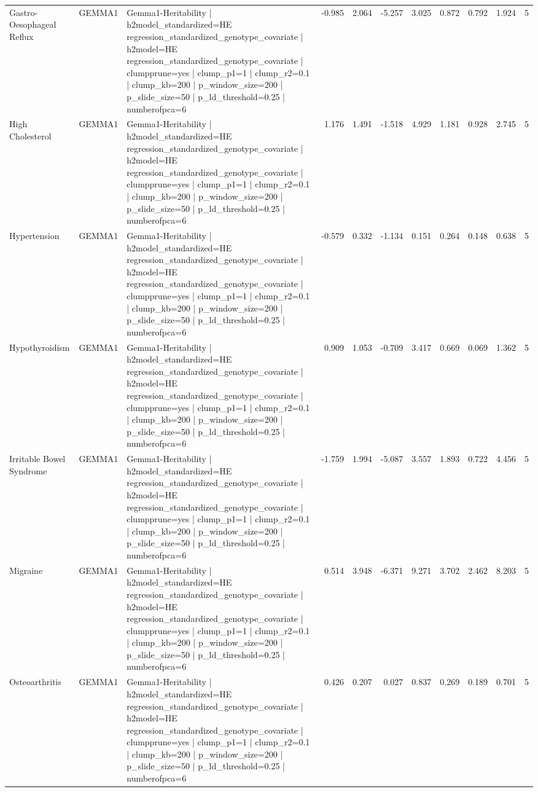 \begin{landscape}
\begin{longtable}{p{2.4cm}p{1.8cm}p{6.0cm}rrrrrrrr}
Gastro-Oesophageal Reflux & GEMMA1 & Gemma1-Heritability | h2model\_standardized=HE regression\_standardized\_genotype\_covariate | h2model=HE regression\_standardized\_genotype\_covariate | clumpprune=yes | clump\_p1=1 | clump\_r2=0.1 | clump\_kb=200 | p\_window\_size=200 | p\_slide\_size=50 | p\_ld\_threshold=0.25 | numberofpca=6 & -0.985 & 2.064 & -5.257 & 3.025 & 0.872 & 0.792 & 1.924 & 5 \\
High Cholesterol & GEMMA1 & Gemma1-Heritability | h2model\_standardized=HE regression\_standardized\_genotype\_covariate | h2model=HE regression\_standardized\_genotype\_covariate | clumpprune=yes | clump\_p1=1 | clump\_r2=0.1 | clump\_kb=200 | p\_window\_size=200 | p\_slide\_size=50 | p\_ld\_threshold=0.25 | numberofpca=6 & 1.176 & 1.491 & -1.518 & 4.929 & 1.181 & 0.928 & 2.745 & 5 \\
Hypertension & GEMMA1 & Gemma1-Heritability | h2model\_standardized=HE regression\_standardized\_genotype\_covariate | h2model=HE regression\_standardized\_genotype\_covariate | clumpprune=yes | clump\_p1=1 | clump\_r2=0.1 | clump\_kb=200 | p\_window\_size=200 | p\_slide\_size=50 | p\_ld\_threshold=0.25 | numberofpca=6 & -0.579 & 0.332 & -1.134 & 0.151 & 0.264 & 0.148 & 0.638 & 5 \\
Hypothyroidism & GEMMA1 & Gemma1-Heritability | h2model\_standardized=HE regression\_standardized\_genotype\_covariate | h2model=HE regression\_standardized\_genotype\_covariate | clumpprune=yes | clump\_p1=1 | clump\_r2=0.1 | clump\_kb=200 | p\_window\_size=200 | p\_slide\_size=50 | p\_ld\_threshold=0.25 | numberofpca=6 & 0.909 & 1.053 & -0.709 & 3.417 & 0.669 & 0.069 & 1.362 & 5 \\
Irritable Bowel Syndrome & GEMMA1 & Gemma1-Heritability | h2model\_standardized=HE regression\_standardized\_genotype\_covariate | h2model=HE regression\_standardized\_genotype\_covariate | clumpprune=yes | clump\_p1=1 | clump\_r2=0.1 | clump\_kb=200 | p\_window\_size=200 | p\_slide\_size=50 | p\_ld\_threshold=0.25 | numberofpca=6 & -1.759 & 1.994 & -5.087 & 3.557 & 1.893 & 0.722 & 4.456 & 5 \\
Migraine & GEMMA1 & Gemma1-Heritability | h2model\_standardized=HE regression\_standardized\_genotype\_covariate | h2model=HE regression\_standardized\_genotype\_covariate | clumpprune=yes | clump\_p1=1 | clump\_r2=0.1 | clump\_kb=200 | p\_window\_size=200 | p\_slide\_size=50 | p\_ld\_threshold=0.25 | numberofpca=6 & 0.514 & 3.948 & -6.371 & 9.271 & 3.702 & 2.462 & 8.203 & 5 \\
Osteoarthritis & GEMMA1 & Gemma1-Heritability | h2model\_standardized=HE regression\_standardized\_genotype\_covariate | h2model=HE regression\_standardized\_genotype\_covariate | clumpprune=yes | clump\_p1=1 | clump\_r2=0.1 | clump\_kb=200 | p\_window\_size=200 | p\_slide\_size=50 | p\_ld\_threshold=0.25 | numberofpca=6 & 0.426 & 0.207 & 0.027 & 0.837 & 0.269 & 0.189 & 0.701 & 5 \\

\end{longtable}
\end{landscape}
